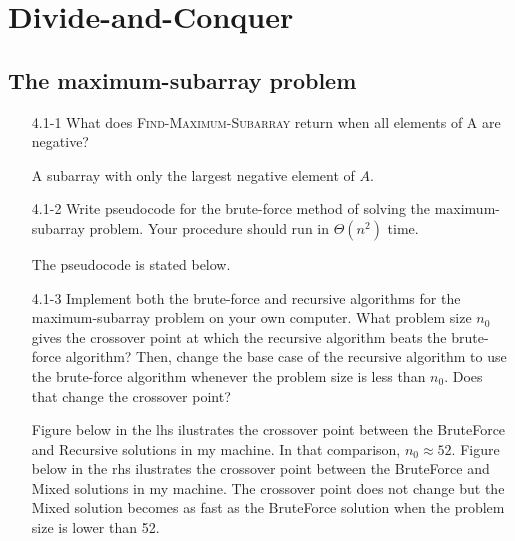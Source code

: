 \chapter{Divide-and-Conquer}

\section{The maximum-subarray problem}

\begin{enumerate}

\item[4.1{-}1]{What does \textsc{Find-Maximum-Subarray} return when all
elements of A are negative?}

\begin{framed}
A subarray with only the largest negative element of $A$.
\end{framed}

\item[4.1{-}2]{Write pseudocode for the brute-force method of solving the
maximum-subarray problem. Your procedure should run in $\Theta(n^2)$ time.}

\begin{framed}
The pseudocode is stated below.\\
\begin{algorithm}[H]
\SetAlgoNoEnd\DontPrintSemicolon
\BlankLine
{}
\end{algorithm}
\end{framed}

\item[4.1{-}3]{Implement both the brute-force and recursive algorithms for the
maximum-subarray problem on your own computer. What problem size $n_0$ gives
the crossover point at which the recursive algorithm beats the brute-force
algorithm? Then, change the base case of the recursive algorithm to use the
brute-force algorithm whenever the problem size is less than $n_0$. Does
that change the crossover point?}



\begin{framed}
Figure below in the lhs ilustrates the crossover point between the
BruteForce and Recursive solutions in my machine. In that comparison, $n_0
\approx 52$. Figure below in the rhs ilustrates the crossover point
between the BruteForce and Mixed solutions in my machine. The crossover point
does not change but the Mixed solution becomes as fast as the BruteForce
solution when the problem size is lower than 52.


\end{framed}
\end{enumerate}
